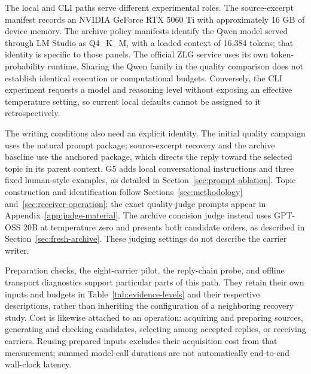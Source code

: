 The local and CLI paths serve different experimental roles. The source-excerpt manifest records an NVIDIA GeForce RTX 5060 Ti with approximately 16 GB of device memory. The archive policy manifests identify the Qwen model served through LM Studio as Q4\_K\_M, with a loaded context of 16,384 tokens; that identity is specific to those panels. The official ZLG service uses its own token-probability runtime. Sharing the Qwen family in the quality comparison does not establish identical execution or computational budgets. Conversely, the CLI experiment requests a model and reasoning level without exposing an effective temperature setting, so current local defaults cannot be assigned to it retrospectively.

The writing conditions also need an explicit identity. The initial quality campaign uses the natural prompt package; source-excerpt recovery and the archive baseline use the anchored package, which directs the reply toward the selected topic in its parent context. G5 adds local conversational instructions and three fixed human-style examples, as detailed in Section~\ref{sec:prompt-ablation}. Topic construction and identification follow Sections~\ref{sec:methodology} and~\ref{sec:receiver-operation}; the exact quality-judge prompts appear in Appendix~\ref{app:judge-material}. The archive concision judge instead uses GPT-OSS 20B at temperature zero and presents both candidate orders, as described in Section~\ref{sec:fresh-archive}. These judging settings do not describe the carrier writer.

Preparation checks, the eight-carrier pilot, the reply-chain probe, and offline transport diagnostics support particular parts of this path. They retain their own inputs and budgets in Table~\ref{tab:evidence-levels} and their respective descriptions, rather than inheriting the configuration of a neighboring recovery study. Cost is likewise attached to an operation: acquiring and preparing sources, generating and checking candidates, selecting among accepted replies, or receiving carriers. Reusing prepared inputs excludes their acquisition cost from that measurement; summed model-call durations are not automatically end-to-end wall-clock latency.
